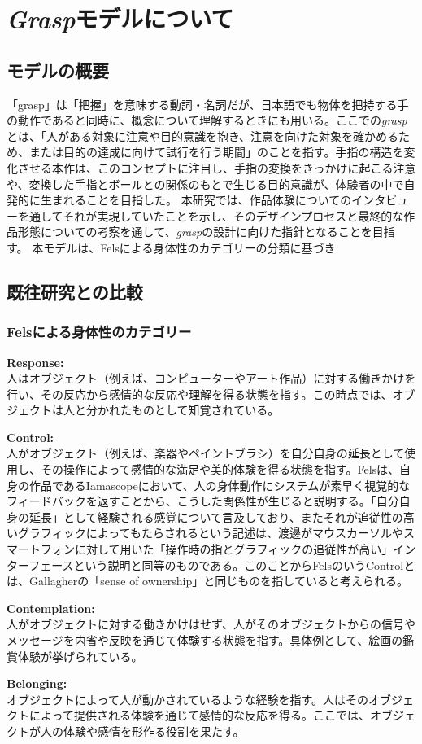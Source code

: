 \chapter{\textit{Grasp}モデルについて}
\label{define_model}

\section{モデルの概要}
「grasp」は「把握」を意味する動詞・名詞だが、日本語でも物体を把持する手の動作であると同時に、概念について理解するときにも用いる。ここでの\textit{grasp}とは、「人がある対象に注意や目的意識を抱き、注意を向けた対象を確かめるため、または目的の達成に向けて試行を行う期間」のことを指す。手指の構造を変化させる本作は、このコンセプトに注目し、手指の変換をきっかけに起こる注意や、変換した手指とボールとの関係のもとで生じる目的意識が、体験者の中で自発的に生まれることを目指した。
本研究では、作品体験についてのインタビューを通してそれが実現していたことを示し、そのデザインプロセスと最終的な作品形態についての考察を通して、\textit{grasp}の設計に向けた指針となることを目指す。
本モデルは、Felsによる身体性のカテゴリーの分類に基づき

\section{既往研究との比較}
\subsection{Felsによる身体性のカテゴリー}
\textbf{Response:}\\
人はオブジェクト（例えば、コンピューターやアート作品）に対する働きかけを行い、その反応から感情的な反応や理解を得る状態を指す。この時点では、オブジェクトは人と分かれたものとして知覚されている。

\textbf{Control:}\\
人がオブジェクト（例えば、楽器やペイントブラシ）を自分自身の延長として使用し、その操作によって感情的な満足や美的体験を得る状態を指す。Felsは、自身の作品であるIamascopeにおいて、人の身体動作にシステムが素早く視覚的なフィードバックを返すことから、こうした関係性が生じると説明する。「自分自身の延長」として経験される感覚について言及しており、またそれが追従性の高いグラフィックによってもたらされるという記述は、渡邊がマウスカーソルやスマートフォンに対して用いた「操作時の指とグラフィックの追従性が高い」インターフェースという説明と同等のものである。このことからFelsのいうControlとは、Gallagherの「sense of ownership」と同じものを指していると考えられる。

\textbf{Contemplation:}\\
人がオブジェクトに対する働きかけはせず、人がそのオブジェクトからの信号やメッセージを内省や反映を通じて体験する状態を指す。具体例として、絵画の鑑賞体験が挙げられている。

\textbf{Belonging:}\\
オブジェクトによって人が動かされているような経験を指す。人はそのオブジェクトによって提供される体験を通じて感情的な反応を得る。ここでは、オブジェクトが人の体験や感情を形作る役割を果たす。
